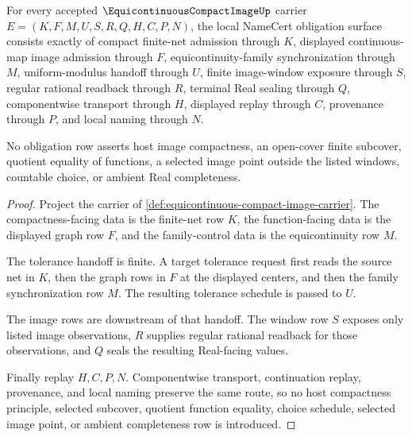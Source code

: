 \begin{theorem}\label{thm:equicontinuous-compact-image-namecert-obligations}
For every accepted $\EquicontinuousCompactImageUp$ carrier $E=(K,F,M,U,S,R,Q,H,C,P,N)$, the local NameCert obligation surface consists exactly of compact finite-net admission through $K$, displayed continuous-map image admission through $F$, equicontinuity-family synchronization through $M$, uniform-modulus handoff through $U$, finite image-window exposure through $S$, regular rational readback through $R$, terminal Real sealing through $Q$, componentwise transport through $H$, displayed replay through $C$, provenance through $P$, and local naming through $N$.

No obligation row asserts host image compactness, an open-cover finite subcover, quotient equality of functions, a selected image point outside the listed windows, countable choice, or ambient Real completeness.
\end{theorem}
\begin{proof}
Project the carrier of \autoref{def:equicontinuous-compact-image-carrier}. The compactness-facing data is the finite-net row $K$, the function-facing data is the displayed graph row $F$, and the family-control data is the equicontinuity row $M$.

The tolerance handoff is finite. A target tolerance request first reads the source net in $K$, then the graph rows in $F$ at the displayed centers, and then the family synchronization row $M$. The resulting tolerance schedule is passed to $U$.

The image rows are downstream of that handoff. The window row $S$ exposes only listed image observations, $R$ supplies regular rational readback for those observations, and $Q$ seals the resulting Real-facing values.

Finally replay $H,C,P,N$. Componentwise transport, continuation replay, provenance, and local naming preserve the same route, so no host compactness principle, selected subcover, quotient function equality, choice schedule, selected image point, or ambient completeness row is introduced.
\end{proof}

